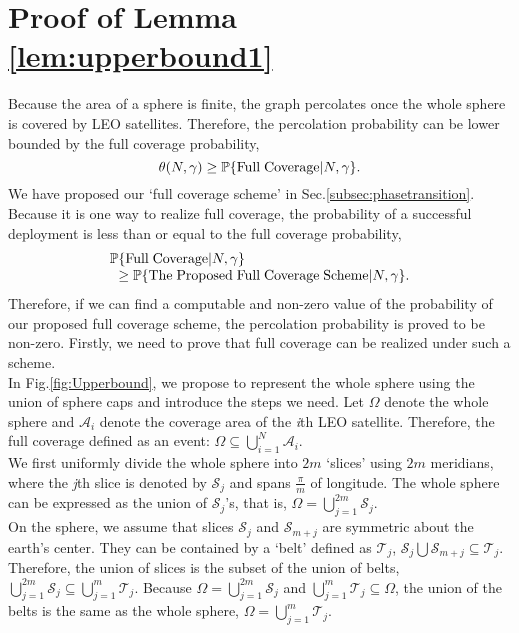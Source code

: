 \documentclass[final]{IEEEtran}
\begin{document}
\section{Proof of Lemma \ref{lem:upperbound1}}
\label{app:upperbound}
Because the area of a sphere is finite, the graph percolates once the whole sphere is covered by LEO satellites. Therefore, the percolation probability can be lower bounded by the full coverage probability, \ie
\begin{equation}
    \theta(N,\gamma)\geq \P\{{\rm Full\;Coverage}|N,\gamma\}.
\label{full}
\end{equation}
\indent We have proposed our `full coverage scheme' in Sec.\ref{subsec:phasetransition}. Because it is one way to realize full coverage, the probability of a successful deployment is less than or equal to the full coverage probability, \ie
\begin{equation}
\begin{array}{r@{}l}
    \P&\{{\rm Full\;Coverage}|N,\gamma\}\\
    &\geq \P\{{\rm The\; Proposed\;Full\;Coverage\;Scheme}|N,\gamma\}.
\end{array}
\label{successfull}
\end{equation}
Therefore, if we can find a computable and non-zero value of the probability of our proposed full coverage scheme, the percolation probability is proved to be non-zero. Firstly, we need to prove that full coverage can be realized under such a scheme. \\
\indent In Fig.\ref{fig:Upperbound}, we propose to represent the whole sphere using the union of sphere caps and introduce the steps we need. Let $\Omega$ denote the whole sphere and $\mathcal{A}_i$ denote the coverage area of the \textit{i}th LEO satellite. Therefore, the full coverage defined as an event: $\Omega\subseteq \bigcup_{i=1}^{N}\mathcal{A}_i$.\\
\indent We first uniformly divide the whole sphere into $2m$ `slices' using $2m$ meridians, where the \textit{j}th slice is denoted by $\mathcal{S}_j$ and spans $\frac{\pi}{m}$ of longitude. The whole sphere can be expressed as the union of $\mathcal{S}_j$'s, that is, $\Omega=\bigcup_{j=1}^{2m}\mathcal{S}_j$.\\
\indent On the sphere, we assume that slices $\mathcal{S}_j$ and $\mathcal{S}_{m+j}$ are symmetric about the earth's center. They can be contained by a `belt' defined as $\mathcal{T}_j$, \ie $\mathcal{S}_j\bigcup\mathcal{S}_{m+j}\subseteq \mathcal{T}_j$. Therefore, the union of slices is the subset of the union of belts, \ie $\bigcup_{j=1}^{2m}\mathcal{S}_j\subseteq \bigcup_{j=1}^{m}\mathcal{T}_j$. Because $\Omega=\bigcup_{j=1}^{2m}\mathcal{S}_j$ and $\bigcup_{j=1}^{m}\mathcal{T}_j\subseteq \Omega$, the union of the belts is the same as the whole sphere, \ie $\Omega=\bigcup_{j=1}^{m}\mathcal{T}_j$.\\
\end{document}
